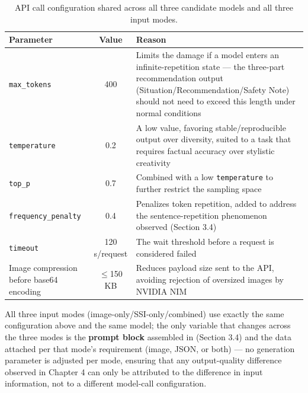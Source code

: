 \documentclass[12pt,a4paper]{report}
\begin{document}
\begin{table}[htbp]
    \centering
    \small
    \caption{API call configuration shared across all three candidate models and all three input modes.}
    \label{tab:3.5}
    \begin{tabularx}{\linewidth}{@{}lcX@{}}
        \toprule
        \textbf{Parameter} & \textbf{Value} & \textbf{Reason} \\
        \midrule
        \texttt{max\_tokens} & 400 & Limits the damage if a model enters an infinite-repetition state --- the three-part recommendation output (Situation/Recommendation/Safety Note) should not need to exceed this length under normal conditions \\
        \texttt{temperature} & 0.2 & A low value, favoring stable/reproducible output over diversity, suited to a task that requires factual accuracy over stylistic creativity \\
        \texttt{top\_p} & 0.7 & Combined with a low \texttt{temperature} to further restrict the sampling space \\
        \texttt{frequency\_penalty} & 0.4 & Penalizes token repetition, added to address the sentence-repetition phenomenon observed (Section 3.4) \\
        \texttt{timeout} & 120 s/request & The wait threshold before a request is considered failed \\
        Image compression before base64 encoding & $\le$150 KB & Reduces payload size sent to the API, avoiding rejection of oversized images by NVIDIA NIM \\
        \bottomrule
    \end{tabularx}
\end{table}

All three input modes (image-only/SSI-only/combined) use exactly the same configuration above and the same model; the only variable that changes across the three modes is the \textbf{prompt block} assembled in (Section 3.4) and the data attached per that mode's requirement (image, JSON, or both) --- no generation parameter is adjusted per mode, ensuring that any output-quality difference observed in Chapter 4 can only be attributed to the difference in input information, not to a different model-call configuration.
\end{document}
